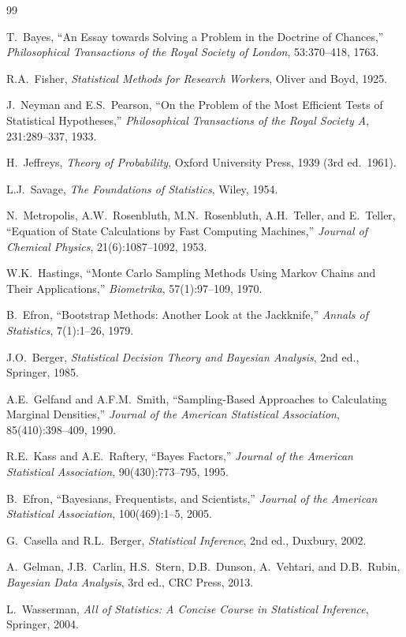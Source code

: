 \documentclass[11pt,a4paper]{article}
\begin{document}
\begin{thebibliography}{99}

 T.~Bayes, ``An Essay towards Solving a Problem in the Doctrine of Chances,'' \textit{Philosophical Transactions of the Royal Society of London}, 53:370--418, 1763.

 R.A.~Fisher, \textit{Statistical Methods for Research Workers}, Oliver and Boyd, 1925.

 J.~Neyman and E.S.~Pearson, ``On the Problem of the Most Efficient Tests of Statistical Hypotheses,'' \textit{Philosophical Transactions of the Royal Society A}, 231:289--337, 1933.

 H.~Jeffreys, \textit{Theory of Probability}, Oxford University Press, 1939 (3rd ed.\ 1961).

 L.J.~Savage, \textit{The Foundations of Statistics}, Wiley, 1954.

 N.~Metropolis, A.W.~Rosenbluth, M.N.~Rosenbluth, A.H.~Teller, and E.~Teller, ``Equation of State Calculations by Fast Computing Machines,'' \textit{Journal of Chemical Physics}, 21(6):1087--1092, 1953.

 W.K.~Hastings, ``Monte Carlo Sampling Methods Using Markov Chains and Their Applications,'' \textit{Biometrika}, 57(1):97--109, 1970.

 B.~Efron, ``Bootstrap Methods: Another Look at the Jackknife,'' \textit{Annals of Statistics}, 7(1):1--26, 1979.

 J.O.~Berger, \textit{Statistical Decision Theory and Bayesian Analysis}, 2nd ed., Springer, 1985.

 A.E.~Gelfand and A.F.M.~Smith, ``Sampling-Based Approaches to Calculating Marginal Densities,'' \textit{Journal of the American Statistical Association}, 85(410):398--409, 1990.

 R.E.~Kass and A.E.~Raftery, ``Bayes Factors,'' \textit{Journal of the American Statistical Association}, 90(430):773--795, 1995.

 B.~Efron, ``Bayesians, Frequentists, and Scientists,'' \textit{Journal of the American Statistical Association}, 100(469):1--5, 2005.

 G.~Casella and R.L.~Berger, \textit{Statistical Inference}, 2nd ed., Duxbury, 2002.

 A.~Gelman, J.B.~Carlin, H.S.~Stern, D.B.~Dunson, A.~Vehtari, and D.B.~Rubin, \textit{Bayesian Data Analysis}, 3rd ed., CRC Press, 2013.

 L.~Wasserman, \textit{All of Statistics: A Concise Course in Statistical Inference}, Springer, 2004.

\end{thebibliography}
\end{document}
